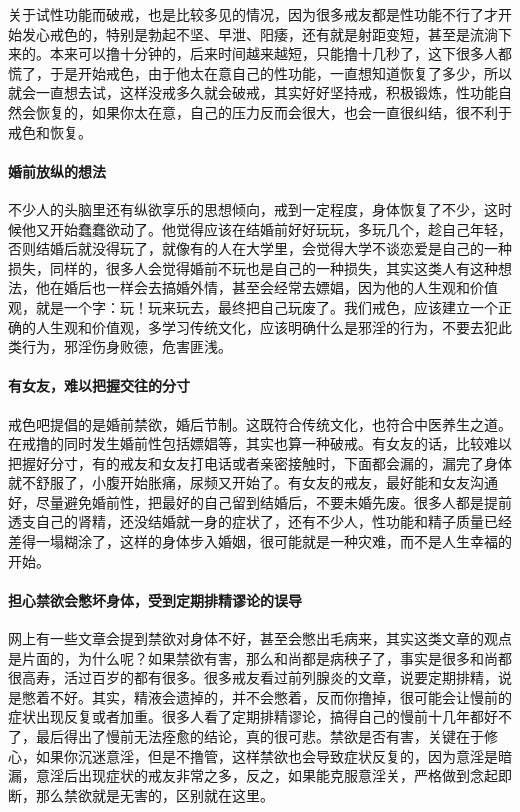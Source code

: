 关于试性功能而破戒，也是比较多见的情况，因为很多戒友都是性功能不行了才开始发心戒色的，特别是勃起不坚、早泄、阳痿，还有就是射距变短，甚至是流淌下来的。本来可以撸十分钟的，后来时间越来越短，只能撸十几秒了，这下很多人都慌了，于是开始戒色，由于他太在意自己的性功能，一直想知道恢复了多少，所以就会一直想去试，这样没戒多久就会破戒，其实好好坚持戒，积极锻炼，性功能自然会恢复的，如果你太在意，自己的压力反而会很大，也会一直很纠结，很不利于戒色和恢复。

\paragraph{婚前放纵的想法}

不少人的头脑里还有纵欲享乐的思想倾向，戒到一定程度，身体恢复了不少，这时候他又开始蠢蠢欲动了。他觉得应该在结婚前好好玩玩，多玩几个，趁自己年轻，否则结婚后就没得玩了，就像有的人在大学里，会觉得大学不谈恋爱是自己的一种损失，同样的，很多人会觉得婚前不玩也是自己的一种损失，其实这类人有这种想法，他在婚后也一样会去搞婚外情，甚至会经常去嫖娼，因为他的人生观和价值观，就是一个字：玩！玩来玩去，最终把自己玩废了。我们戒色，应该建立一个正确的人生观和价值观，多学习传统文化，应该明确什么是邪淫的行为，不要去犯此类行为，邪淫伤身败德，危害匪浅。

\paragraph{有女友，难以把握交往的分寸}

戒色吧提倡的是婚前禁欲，婚后节制。这既符合传统文化，也符合中医养生之道。在戒撸的同时发生婚前性包括嫖娼等，其实也算一种破戒。有女友的话，比较难以把握好分寸，有的戒友和女友打电话或者亲密接触时，下面都会漏的，漏完了身体就不舒服了，小腹开始胀痛，尿频又开始了。有女友的戒友，最好能和女友沟通好，尽量避免婚前性，把最好的自己留到结婚后，不要未婚先废。很多人都是提前透支自己的肾精，还没结婚就一身的症状了，还有不少人，性功能和精子质量已经差得一塌糊涂了，这样的身体步入婚姻，很可能就是一种灾难，而不是人生幸福的开始。

\paragraph{担心禁欲会憋坏身体，受到定期排精谬论的误导}

网上有一些文章会提到禁欲对身体不好，甚至会憋出毛病来，其实这类文章的观点是片面的，为什么呢？如果禁欲有害，那么和尚都是病秧子了，事实是很多和尚都很高寿，活过百岁的都有很多。很多戒友看过前列腺炎的文章，说要定期排精，说是憋着不好。其实，精液会遗掉的，并不会憋着，反而你撸掉，很可能会让慢前的症状出现反复或者加重。很多人看了定期排精谬论，搞得自己的慢前十几年都好不了，最后得出了慢前无法痊愈的结论，真的很可悲。禁欲是否有害，关键在于修心，如果你沉迷意淫，但是不撸管，这样禁欲也会导致症状反复的，因为意淫是暗漏，意淫后出现症状的戒友非常之多，反之，如果能克服意淫关，严格做到念起即断，那么禁欲就是无害的，区别就在这里。

